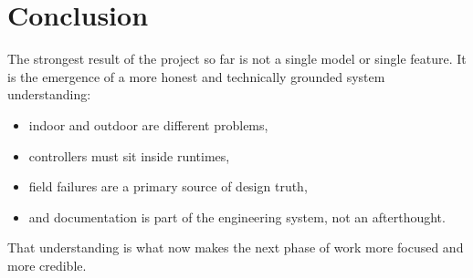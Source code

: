 \documentclass[11pt]{article}
\begin{document}
\section{Conclusion}
The strongest result of the project so far is not a single model or single feature. It is the emergence of a more honest and technically grounded system understanding:
\begin{itemize}[leftmargin=*]
  \item indoor and outdoor are different problems,
  \item controllers must sit inside runtimes,
  \item field failures are a primary source of design truth,
  \item and documentation is part of the engineering system, not an afterthought.
\end{itemize}

That understanding is what now makes the next phase of work more focused and more credible.
\end{document}

